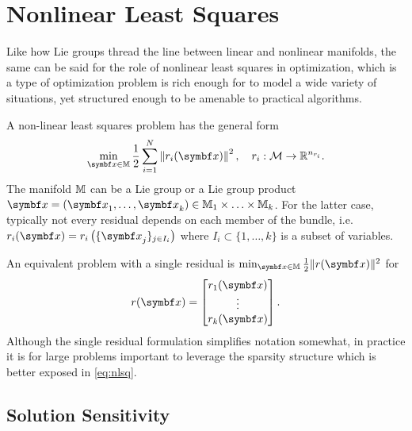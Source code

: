 
\chapter{Nonlinear Least Squares}

Like how Lie groups thread the line between linear and nonlinear manifolds, the same can be said for the role of nonlinear least squares in optimization, which is a type of optimization problem is rich enough for to model a wide variety of situations, yet structured enough to be amenable to practical algorithms.

A non-linear least squares problem has the general form
\begin{equation}
  \label{eq:nlsq}
  \min_{\x \in \M} \frac{1}{2} \sum_{i=1}^{N} \left\| r_{i}(\x) \right\|^{2}, \quad r_{i} : \mathcal M \rightarrow \mathbb{R}^{n_{r_{i}}}.
\end{equation}
The manifold $\mathbb{M}$ can be a Lie group or a Lie group product $\x = (\x_{1}, \ldots, \x_{k}) \in \M_{1} \times \ldots \times \M_{k}$. For the latter case, typically not every residual depends on each member of the bundle, i.e. $r_{i}(\x) = r_{i}\left( \{ \x_{j}\}_{j \in I_{i}} \right)$ where $I_{i} \subset \{ 1, \ldots, k\}$ is a subset of variables.

\begin{remark}
  An equivalent problem with a single residual is $\min_{\x \in \M} \frac{1}{2} \| r(\x) \|^{2}$ for
  \begin{equation}
    r(\x) =
    \begin{bmatrix}
      r_{1}(\x) \\
      \vdots \\
      r_{k}(\x)
    \end{bmatrix}.
  \end{equation}
  Although the single residual formulation simplifies notation somewhat, in practice it is for large problems important to leverage the sparsity structure which is better exposed in \eqref{eq:nlsq}.
\end{remark}


\section{Solution Sensitivity}

